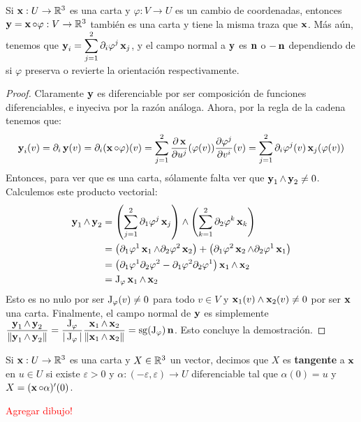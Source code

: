 \begin{prop}\label{prop::cartacambiodecoordenadas}
Si $\x:U\to\RR^3$ es una carta y $\varphi:V\to U$ es un cambio de coordenadas, entonces $\y=\x\circ\varphi:V\to\RR^3$ también es una carta y tiene la misma traza que $\x$. Más aún, tenemos que $\y_i = \displaystyle\sum_{j=1}^2 \partial_i \varphi^j \x_j$, y el campo normal a $\y$ es $\n$ o $-\n$ dependiendo de si $\varphi$ preserva o revierte la orientación respectivamente.
\begin{proof}
Claramente $\y$ es diferenciable por ser composición de funciones diferenciables, e inyeciva por la razón análoga. Ahora, por la regla de la cadena tenemos que: $$\y_i(v)=\partial_i\y(v)=\partial_i (\x\circ\varphi)(v)=\displaystyle\sum_{j=1}^2 \dfrac{\partial\x}{\partial u^j}(\varphi(v))\dfrac{\partial\varphi^j}{\partial v^i}(v) = \displaystyle\sum_{j=1}^2 \partial_i\varphi^j(v)\x_j(\varphi(v))$$ Entonces, para ver que es una carta, sólamente falta ver que $\y_1\wedge\y_2\neq 0$. Calculemos este producto vectorial:
\begin{align*}
\y_1\wedge\y_2 &= \left(\displaystyle\sum_{j=1}^2 \partial_1 \varphi^j\x_j\right)\wedge\left(\displaystyle\sum_{k=1}^2 \partial_2 \varphi^k\x_k\right) \\ &= \left(\partial_1\varphi^1\x_1\wedge\partial_2\varphi^2\x_2\right) + \left(\partial_1\varphi^2\x_2\wedge\partial_2\varphi^1\x_1\right)\\
&=\left(\partial_1\varphi^1\partial_2\varphi^2 - \partial_1\varphi^2\partial_2\varphi^1\right) \x_1\wedge \x_2\\
&= \J_\varphi \x_1\wedge\x_2
\end{align*}
Esto es no nulo por ser $\J_\varphi(v)\neq 0$ para todo $v\in V$ y $\x_1(v)\wedge\x_2(v)\neq 0$ por ser $\x$ una carta. Finalmente, el campo normal de $\y$ es simplemente $\dfrac{\y_1\wedge\y_2}{\norm{\y_1\wedge\y_2}} = \dfrac{\J_\varphi}{|\J_\varphi|}\dfrac{\x_1\wedge\x_2}{\norm{\x_1\wedge\x_2}} = \sg(\J_\varphi)\n$. Esto concluye la demostración.
\end{proof}
\end{prop}

\begin{defn}
Si $\x:U\to\RR^3$ es una carta y $X\in\RR^3$ un vector, decimos que $X$ es \textbf{tangente} a $\x$ en $u\in U$ si existe $\varepsilon>0$ y $\alpha:(-\varepsilon,\varepsilon)\to U$ diferenciable tal que $\alpha(0)=u$ y $X = (\x\circ\alpha)'(0)$.
\end{defn}
\textcolor{red}{Agregar dibujo!}


